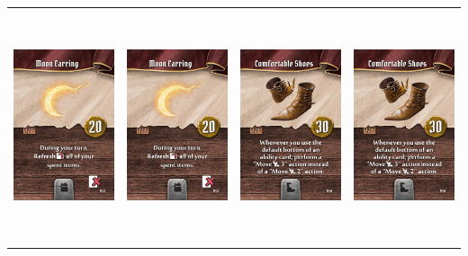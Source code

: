 \documentclass{minimal}
\begin{document}
{\begin{longtable}{llll}
\includegraphics[width=44mm,height=68mm]{./22-28/gh-028-moon-earring.png} &
\includegraphics[width=44mm,height=68mm]{./22-28/gh-028-moon-earring.png} &
\includegraphics[width=44mm,height=68mm]{./29-35/gh-029-comfortable-shoes.png} &
\includegraphics[width=44mm,height=68mm]{./29-35/gh-029-comfortable-shoes.png}\\ 

\end{longtable}}
\end{document}
